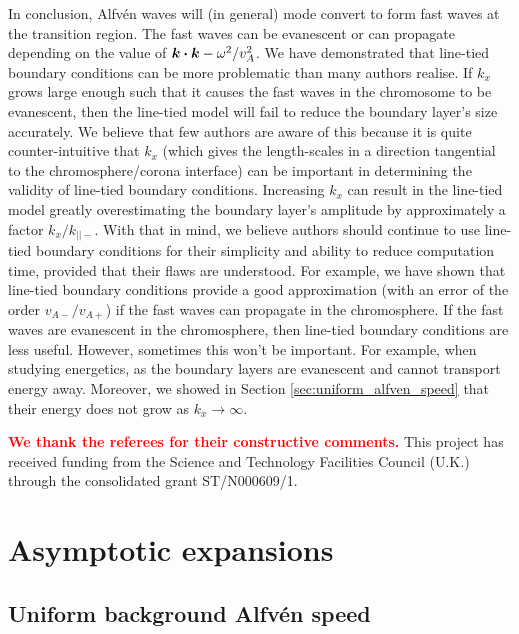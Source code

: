 \documentclass[linenumbers]{aastex63}
\let\vec\boldsymbol
\newcommand{\alexedit}[1]{\textcolor{red}{\textbf{#1}}}
\begin{document}
In conclusion, Alfv\'en waves will (in general) mode convert to form fast waves at the transition region. The fast waves can be evanescent or can propagate depending on the value of $\vec{k}\vdot\vec{k} - \omega^2/v_A^2$. We have demonstrated that line-tied boundary conditions can be more problematic than many authors realise. If $k_x$ grows large enough such that it causes the fast waves in the chromosome to be evanescent, then the line-tied model will fail to reduce the boundary layer's size accurately. We believe that few authors are aware of this because it is quite counter-intuitive that $k_x$ (which gives the length-scales in a direction tangential to the chromosphere/corona interface) can be important in determining the validity of line-tied boundary conditions. Increasing $k_x$ can result in the line-tied model greatly overestimating the boundary layer's amplitude by approximately a factor $k_x / k_{||-}$. With that in mind, we believe authors should continue to use line-tied boundary conditions for their simplicity and ability to reduce computation time, provided that their flaws are understood. For example, we have shown that line-tied boundary conditions provide a good approximation (with an error of the order $v_{A-}/v_{A+}$) if the fast waves can propagate in the chromosphere. If the fast waves are evanescent in the chromosphere, then line-tied boundary conditions are less useful. However, sometimes this won't be important. For example, when studying energetics, as the boundary layers are evanescent and cannot transport energy away. Moreover, we showed in Section \ref{sec:uniform_alfven_speed} that their energy does not grow as $k_x\rightarrow \infty$.

\acknowledgments

\alexedit{We thank the referees for their constructive comments.} This project has received funding from the Science and Technology Facilities Council (U.K.) through the consolidated grant ST/N000609/1.

\appendix

\section{Asymptotic expansions}
\label{adx:asymptotic_expansions}

\subsection{Uniform background Alfv\'en speed}
\label{adx:uniform_background_alfven_speed}
\end{document}
